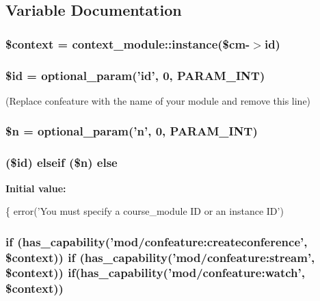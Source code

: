 \subsection{Variable Documentation}
\hypertarget{view_8php_ae05dedb802ada0155efdece2044fed64}{
\subsubsection[{\$context}]{\setlength{\rightskip}{0pt plus 5cm}\$context = context\-\_\-module\-::instance(\$cm-\/$>$id)}}\label{view_8php_ae05dedb802ada0155efdece2044fed64}
\hypertarget{view_8php_ae97941710d863131c700f069b109991e}{
\subsubsection[{\$id}]{\setlength{\rightskip}{0pt plus 5cm}\$id = optional\-\_\-param('id', 0, P\-A\-R\-A\-M\-\_\-\-I\-N\-T)}}\label{view_8php_ae97941710d863131c700f069b109991e}


(Replace confeature with the name of your module and remove this line) 

\hypertarget{view_8php_aa5fae90470d460a65d5211ec08e6b05c}{
\subsubsection[{\$n}]{\setlength{\rightskip}{0pt plus 5cm}\$n = optional\-\_\-param('n', 0, P\-A\-R\-A\-M\-\_\-\-I\-N\-T)}}\label{view_8php_aa5fae90470d460a65d5211ec08e6b05c}
\hypertarget{view_8php_a0e55d2fc7d7599dbe8a6ed40e67f653b}{
\subsubsection[{else}]{ (\$id) elseif (\$n) else}}\label{view_8php_a0e55d2fc7d7599dbe8a6ed40e67f653b}
{\bfseries Initial value\-:}
\begin{DoxyCode}
\{
    error(\textcolor{stringliteral}{'You must specify a course\_module ID or an instance ID'})
\end{DoxyCode}
\hypertarget{view_8php_abf65f0046bca4eaf168cd62bab83f411}{
\subsubsection[{if}]{\setlength{\rightskip}{0pt plus 5cm}if (has\-\_\-capability('mod/confeature\-:createconference', \$context)) if (has\-\_\-capability('mod/confeature\-:stream', \$context)) if(has\-\_\-capability('mod/confeature\-:watch', \$context))}}\label{view_8php_abf65f0046bca4eaf168cd62bab83f411}
